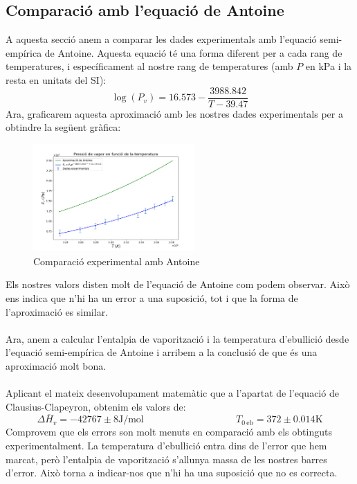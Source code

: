 \documentclass{article}
\begin{document}
    \subsection{Comparació amb l'equació de Antoine}
    A aquesta secció anem a comparar les dades experimentals amb l'equació semi-empírica de Antoine. Aquesta equació té una forma diferent per a cada rang de temperatures, i específicament al nostre rang de temperatures (amb $P$ en \si{\kilo\pascal} i la resta en unitats del SI): \[\log\left(P_v\right)=16.573 - \frac{3988.842}{T - 39.47}\]
    Ara, graficarem aquesta aproximació amb les nostres dades experimentals per a obtindre la següent gràfica:
    \begin{figure}[h]\label{fig:antoine}
        \centering
        \includegraphics[width=0.55\textwidth]{fotos/antoine.png}
        \caption{Comparació experimental amb Antoine}
    \end{figure}
    Els nostres valors disten molt de l'equació de Antoine com podem observar. Això ens indica que n'hi ha un error a una suposició, tot i que la forma de l'aproximació es similar.\\ \\Ara, anem a calcular l'entalpia de vaporització i la temperatura d'ebullició desde l'equació semi-empírica de Antoine i arribem a la conclusió de que és una aproximació molt bona.\\ \\Aplicant el mateix desenvolupament matemàtic que a l'apartat de l'equació de Clausius-Clapeyron, obtenim els valors de: \[\Delta\overline{H}_v = -42767\pm8\si{\joule}\text{/}\si{\mol} \hspace{4cm} T_{0\ \text{eb}} = 372 \pm 0.014 \si{\kelvin}\] Comprovem que els errors son molt menuts en comparació amb els obtinguts experimentalment. La temperatura d'ebullició entra dins de l'error que hem marcat, però l'entalpia de vaporització s'allunya massa de les nostres barres d'error. Això torna a indicar-nos que n'hi ha una suposició que no es correcta.
\end{document}
